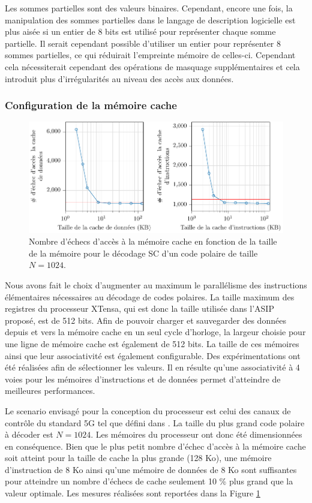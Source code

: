 Les sommes partielles sont des valeurs binaires. Cependant, encore une fois, la manipulation des sommes partielles dans le langage de description logicielle est plus aisée si un entier de 8 bits est utilisé pour représenter chaque somme partielle. Il serait cependant possible d'utiliser un entier pour représenter 8 sommes partielles, ce qui réduirait l'empreinte mémoire de celles-ci. Cependant cela nécessiterait cependant des opérations de masquage supplémentaires et cela introduit plus d'irrégularités au niveau des accès aux données.

\subsubsection{Configuration de la mémoire cache}
\begin{figure}
\centering
\includegraphics[width=\textwidth]{main/ch3_fig/curves/memory/tikz/memory}
\caption{Nombre d'échecs d'accès à la mémoire cache en fonction de la taille de la mémoire pour le décodage SC d'un code polaire de taille $N=1024$.}
\label{fig:tensilica_mem}
\end{figure}

Nous avons fait le choix d'augmenter au maximum le parallélisme des instructions élémentaires nécessaires au décodage de codes polaires. La taille maximum des registres du processeur XTensa, qui est donc la taille utilisée dans l'ASIP proposé, est de 512 bits. Afin de pouvoir charger et sauvegarder des données depuis et vers la mémoire cache en un seul cycle d'horloge, la largeur choisie pour une ligne de mémoire cache est également de 512 bits. La taille de ces mémoires ainsi que leur associativité est également configurable. Des expérimentations ont été réalisées afin de sélectionner les valeurs. Il en résulte qu'une associativité à 4 voies pour les mémoires d'instructions et de données permet d'atteindre de meilleures performances.

Le scenario envisagé pour la conception du processeur est celui des canaux de contrôle du standard 5G tel que défini dans \cite{3gpp_ts_2017}. La taille du plus grand code polaire à décoder est $N=1024$. Les mémoires du processeur ont donc été dimensionnées en conséquence.
Bien que le plus petit nombre d'échec d'accès à la mémoire cache soit atteint pour la taille de cache la plus grande (128 Ko), une mémoire d'instruction de 8 Ko ainsi qu'une mémoire de données de 8 Ko sont suffisantes pour atteindre un nombre d'échecs de cache seulement 10 \% plus grand que la valeur optimale. Les mesures réalisées sont reportées dans la Figure \ref{fig:tensilica_mem}

